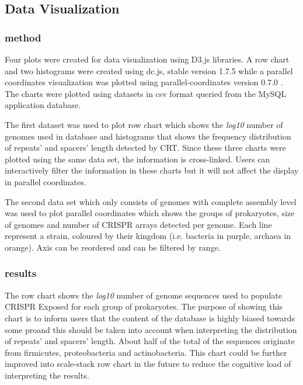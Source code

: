 \documentclass[11pt, a4paper,titlepage]{article}
\begin{document}
\subsection{Data Visualization}

\subsubsection{method}

Four plots were created for data visualization using D3.js
libraries. A row chart and two histograms were created using dc.js,
stable version 1.7.5 \cite{DcJs} while a parallel coordinates
visualization was plotted using parallel-coordinates version 0.7.0
\cite{ParCoordJs}. The charts were plotted using datasets in csv
format queried from the MySQL application database.

The first dataset was used to plot row chart which shows the
\emph{log10} number of genomes used in database and histograms that
shows the frequency distribution of repeats’ and spacers’ length
detected by CRT. Since these three charts were plotted using the same
data set, the information is cross-linked. Users can interactively
filter the information in these charts but it will not affect the
display in parallel coordinates.

The second data set which only consists of genomes with complete
assembly level was used to plot parallel coordinates which shows the
groups of prokaryotes, size of genomes and number of CRISPR arrays
detected per genome. Each line represent a strain, coloured by their
kingdom (i.e. bacteria in purple, archaea in orange). Axis can be
reordered and can be filtered by range.

\subsubsection{results}

The row chart shows the \emph{log10} number of genome sequences used
to populate CRISPR Exposed for each group of prokaryotes. The purpose
of showing this chart is to inform users that the content of the
database is highly biased towards some proand this should be taken
into account when interpreting the distribution of repeats’ and
spacers’ length. About half of the total of the sequences originate
from firmicutes, proteobacteria and actinobacteria. This chart could
be further improved into scale-stack row chart in the future to reduce
the cognitive load of interpreting the results.
\end{document}
